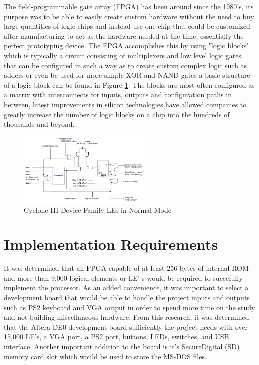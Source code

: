 \documentclass[conference]{IEEEtran}
\begin{document}
The field-programmable gate array (FPGA) has been around since the 1980's, its purpose was to be able to easily create custom hardware without the need to buy large quantities of logic chips and instead use one chip that could be customized after manufacturing to act as the hardware needed at the time, essentially the perfect prototyping device. The FPGA accomplishes this by using "logic blocks" which is typically a circuit consisting of multiplexers and low level logic gates that can be configured in such a way as to create custom complex logic such as adders or even be used for more simple XOR and NAND gates a basic structure of a logic block can be found in Figure \ref{fig_LogicElement}. The blocks are most often configured as a matrix with interconnects for inputs, outputs and configuration paths in between, latest improvements in silicon technologies have allowed companies to greatly increase the number of logic blocks on a chip into the hundreds of thousands and beyond.

\begin{figure}[!t]
\centering
\includegraphics[width=2.5in]{LogicElement}
\caption{Cyclone III Device Family LEs in Normal Mode \cite{CycloneHandbook}}
\label{fig_LogicElement}
\end{figure}

\section{Implementation Requirements}
It was determined that an FPGA capable of at least 256 bytes of internal ROM and more than 9,000 logical elements or LE' s would be required to succefully implement the processor. As an added convenience, it was important to select a development board that would be able to handle the project inputs and outputs such as PS2 keyboard and VGA output in order to spend more time on the study and not building miscellaneous hardware.  From this research, it was determined that the Altera DE0 development board sufficiently the project needs with over 15,000 LE's, a VGA port, a PS2 port, buttons, LEDs, switches, and USB interface. Another important addition to the board is it's SecureDigital (SD) memory card slot which would be used to store the MS-DOS files.
\end{document}
